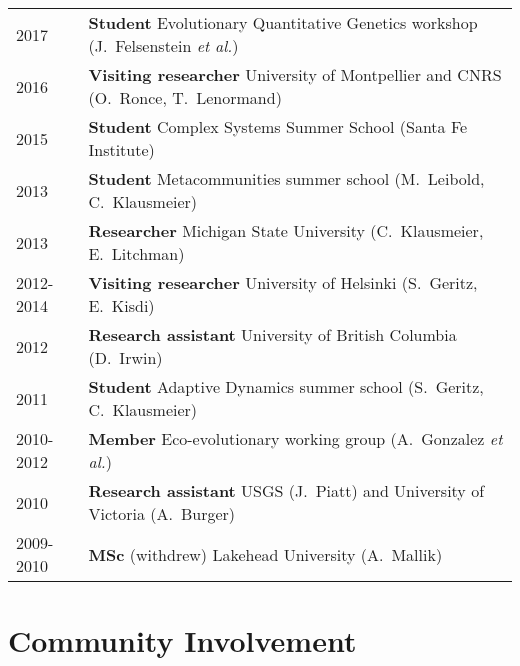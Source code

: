 \documentclass[12pt]{article}
\begin{document}
\begin{tabular}{ll}
2017 & \textbf{Student} Evolutionary Quantitative Genetics workshop (J.\ Felsenstein \textit{et al.})\\
2016 & \textbf{Visiting researcher} University of Montpellier and CNRS (O.\ Ronce, T.\ Lenormand)\\ 
2015 & \textbf{Student} Complex Systems Summer School (Santa Fe Institute)\\
2013 &  \textbf{Student} Metacommunities summer school  (M.\ Leibold, C.\ Klausmeier)\\
2013 &  \textbf{Researcher} Michigan State University (C.\ Klausmeier, E.\ Litchman)\\
2012-2014 &  \textbf{Visiting researcher} University of Helsinki (S.\ Geritz, E.\ Kisdi)\\ 
2012 &  \textbf{Research assistant} University of British Columbia (D.\ Irwin)\\
2011 &  \textbf{Student} Adaptive Dynamics summer school  (S.\ Geritz, C.\ Klausmeier)\\
2010-2012 &  \textbf{Member} Eco-evolutionary working group (A.\ Gonzalez \textit{et al.})\\
2010 & \textbf{Research assistant} USGS (J.\ Piatt) and University of Victoria (A.\ Burger) \\
2009-2010 & \textbf{MSc} (withdrew) Lakehead University (A.\ Mallik) \\
\end{tabular}

\newpage
\section*{Community Involvement}
\end{document}
